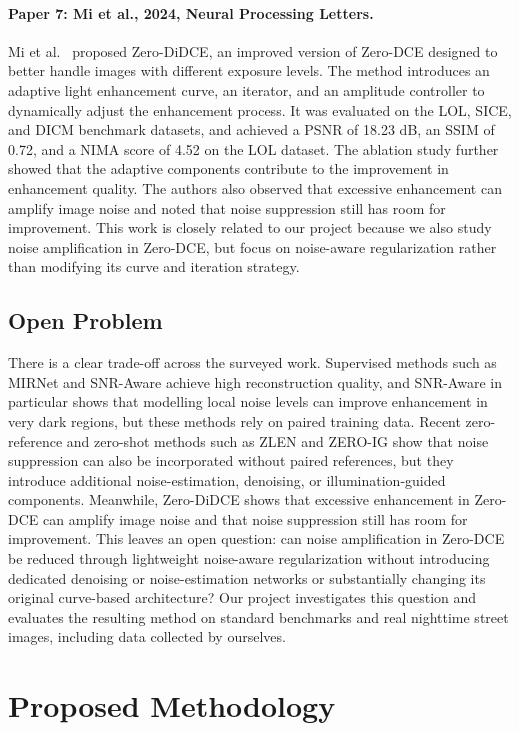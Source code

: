 \documentclass[11pt, letterpaper]{article}
\begin{document}
\paragraph{Paper 7: Mi et al., 2024, Neural Processing Letters.}
Mi et al.~\cite{mi2024rethinking} proposed Zero-DiDCE, an improved version of Zero-DCE designed to better handle images with different exposure levels. The method introduces an adaptive light enhancement curve, an iterator, and an amplitude controller to dynamically adjust the enhancement process. It was evaluated on the LOL, SICE, and DICM benchmark datasets, and achieved a PSNR of 18.23 dB, an SSIM of 0.72, and a NIMA score of 4.52 on the LOL dataset. The ablation study further showed that the adaptive components contribute to the improvement in enhancement quality. The authors also observed that excessive enhancement can amplify image noise and noted that noise suppression still has room for improvement. This work is closely related to our project because we also study noise amplification in Zero-DCE, but focus on noise-aware regularization rather than modifying its curve and iteration strategy.

\subsection{Open Problem}

There is a clear trade-off across the surveyed work. Supervised methods such as MIRNet and SNR-Aware achieve high reconstruction quality, and SNR-Aware in particular shows that modelling local noise levels can improve enhancement in very dark regions, but these methods rely on paired training data. Recent zero-reference and zero-shot methods such as ZLEN and ZERO-IG show that noise suppression can also be incorporated without paired references, but they introduce additional noise-estimation, denoising, or illumination-guided components. Meanwhile, Zero-DiDCE shows that excessive enhancement in Zero-DCE can amplify image noise and that noise suppression still has room for improvement. This leaves an open question: can noise amplification in Zero-DCE be reduced through lightweight noise-aware regularization without introducing dedicated denoising or noise-estimation networks or substantially changing its original curve-based architecture? Our project investigates this question and evaluates the resulting method on standard benchmarks and real nighttime street images, including data collected by ourselves.

\section{Proposed Methodology}
\end{document}

